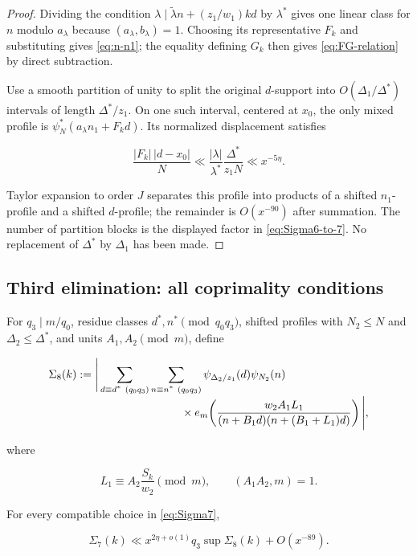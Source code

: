 \begin{proof}
Dividing the condition
$\lambda\mid\widetilde\lambda n+(z_1/w_1)kd$ by $\lambda^*$ gives one
linear class for $n$ modulo $a_\lambda$ because
$(a_\lambda,b_\lambda)=1$.  Choosing its representative $F_k$ and
substituting gives \cref{eq:n-n1}; the equality defining $G_k$ then gives
\cref{eq:FG-relation} by direct subtraction.

Use a smooth partition of unity to split the original $d$-support into
$O(\Delta_1/\Delta^*)$ intervals of length $\Delta^*/z_1$.  On one such
interval, centered at $x_0$, the only mixed profile is
$\psi_N^*(a_\lambda n_1+F_kd)$.  Its normalized displacement satisfies

\[
 \frac{|F_k|\,|d-x_0|}{N}
 \ll \frac{|\lambda|}{\lambda^*}
       \frac{\Delta^*}{z_1N}
 \ll x^{-5\eta}.
\]

Taylor expansion to order $J$ separates this profile into products of a
shifted $n_1$-profile and a shifted $d$-profile; the remainder is
$O(x^{-90})$ after summation.  The number of partition blocks is the displayed
factor in \cref{eq:Sigma6-to-7}.  No replacement of $\Delta^*$ by
$\Delta_1$ has been made.
\end{proof}

\subsection{Third elimination: all coprimality conditions}

For $q_3\mid m/q_0$, residue classes $d^*,n^*\pmod{q_0q_3}$, shifted
profiles with $N_2\le N$ and $\Delta_2\le\Delta^*$, and units
$A_1,A_2\pmod m$, define

\begin{align}
\Sigma_8(k):={}&\Bigg|
 \sum_{\substack{d\equiv d^*\ (q_0q_3)}}
 \sum_{\substack{n\equiv n^*\ (q_0q_3)}}
 \psi_{\Delta_2/z_1}(d)\psi_{N_2}(n)\notag\\[-1mm]
&\hspace{27mm}\times
 e_m\!\left(
 \frac{w_2A_1L_1}
 {(n+B_1d)(n+(B_1+L_1)d)}
 \right)\Bigg|,
 \label{eq:Sigma8}
\end{align}

where

\begin{equation}\label{eq:L1}
 L_1\equiv A_2\frac{S_k}{w_2}\pmod m,
 \qquad (A_1A_2,m)=1.
\end{equation}

\begin{lemma}\label{lem:coprimality-elimination}
For every compatible choice in \cref{eq:Sigma7},

\begin{equation}\label{eq:Sigma7-to-8}
 \Sigma_7(k)
 \ll x^{2\eta+o(1)}q_3\sup\Sigma_8(k)+O(x^{-89}).
\end{equation}
\end{lemma}

